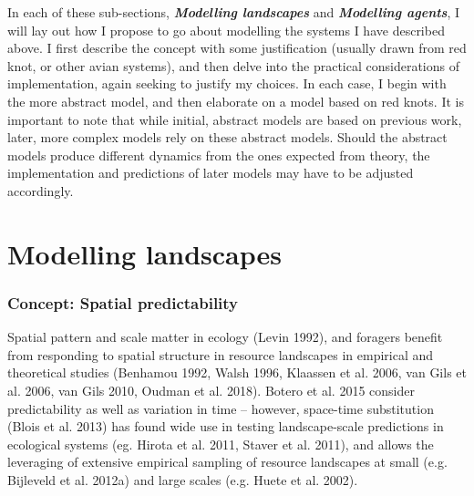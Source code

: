 \documentclass[]{scrartcl}
\begin{document}
\begin{linenumbers}
In each of these sub-sections, \emph{\textbf{Modelling landscapes}} and
\emph{\textbf{Modelling agents}}, I will lay out how I propose to go
about modelling the systems I have described above. I first describe the
concept with some justification (usually drawn from red knot, or other
avian systems), and then delve into the practical considerations of
implementation, again seeking to justify my choices. In each case, I
begin with the more abstract model, and then elaborate on a model based
on red knots. It is important to note that while initial, abstract
models are based on previous work, later, more complex models rely on
these abstract models. Should the abstract models produce different
dynamics from the ones expected from theory, the implementation and
predictions of later models may have to be adjusted accordingly.

  \section{Modelling landscapes}\label{modelling-landscapes}
    \subsubsection{Concept: Spatial
    predictability}\label{concept-spatial-predictability}

Spatial pattern and scale matter in ecology
(\protect\hypertarget{__UnoMark__4011_580056431}{}{}Levin 1992), and
foragers benefit from responding to spatial structure in resource
landscapes in empirical and theoretical studies
(\protect\hypertarget{__UnoMark__4018_580056431}{}{}Benhamou 1992, Walsh
1996, Klaassen et al. 2006, van Gils et al. 2006, van Gils 2010, Oudman
et al. 2018). \protect\hypertarget{__UnoMark__4025_580056431}{}{}Botero
et al. 2015 consider predictability as well as variation in time --
however, space-time substitution
(\protect\hypertarget{__UnoMark__4032_580056431}{}{}Blois et al. 2013)
has found wide use in testing landscape-scale predictions in ecological
systems (eg. \protect\hypertarget{__UnoMark__4039_580056431}{}{}Hirota
et al. 2011, Staver et al. 2011), and allows the leveraging of extensive
empirical sampling of resource landscapes at small (e.g.
\protect\hypertarget{__UnoMark__4046_580056431}{}{}Bijleveld et al.
2012a) and large scales (e.g.
\protect\hypertarget{__UnoMark__4053_580056431}{}{}Huete et al. 2002).


\end{linenumbers}
\end{document}
